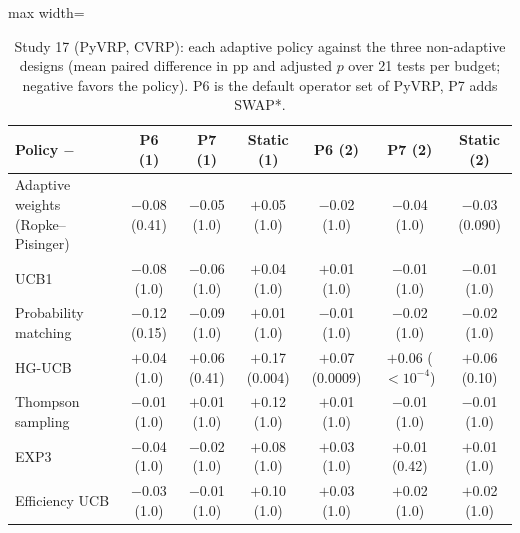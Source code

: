 \begin{table}[t]
\caption{Study 17 (PyVRP, CVRP): each adaptive policy against the three non-adaptive designs (mean paired difference in pp and adjusted $p$ over 21 tests per budget; negative favors the policy). P6 is the default operator set of PyVRP, P7 adds SWAP*.}\label{tab:s17m}
\centering
\small
\begin{adjustbox}{max width=\linewidth}
\begin{tabular}{lcccccc}
\toprule
Policy $-$ & P6 (1) & P7 (1) & Static (1) & P6 (2) & P7 (2) & Static (2) \\
\midrule
Adaptive weights (Ropke--Pisinger) & $-$0.08 (0.41) & $-$0.05 (1.0) & $+$0.05 (1.0) & $-$0.02 (1.0) & $-$0.04 (1.0) & $-$0.03 (0.090) \\
UCB1 & $-$0.08 (1.0) & $-$0.06 (1.0) & $+$0.04 (1.0) & $+$0.01 (1.0) & $-$0.01 (1.0) & $-$0.01 (1.0) \\
Probability matching & $-$0.12 (0.15) & $-$0.09 (1.0) & $+$0.01 (1.0) & $-$0.01 (1.0) & $-$0.02 (1.0) & $-$0.02 (1.0) \\
HG-UCB & $+$0.04 (1.0) & $+$0.06 (0.41) & $+$0.17 (0.004) & $+$0.07 (0.0009) & $+$0.06 (\ensuremath{<10^{-4}}) & $+$0.06 (0.10) \\
Thompson sampling & $-$0.01 (1.0) & $+$0.01 (1.0) & $+$0.12 (1.0) & $+$0.01 (1.0) & $-$0.01 (1.0) & $-$0.01 (1.0) \\
EXP3 & $-$0.04 (1.0) & $-$0.02 (1.0) & $+$0.08 (1.0) & $+$0.03 (1.0) & $+$0.01 (0.42) & $+$0.01 (1.0) \\
Efficiency UCB & $-$0.03 (1.0) & $-$0.01 (1.0) & $+$0.10 (1.0) & $+$0.03 (1.0) & $+$0.02 (1.0) & $+$0.02 (1.0) \\
\bottomrule
\end{tabular}
\end{adjustbox}
\end{table}
